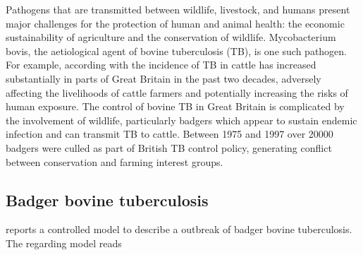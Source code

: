 Pathogens that are transmitted between wildlife, livestock, and humans present
major challenges for the protection of human and animal health: the economic
sustainability of agriculture and the conservation of wildlife. Mycobacterium
bovis, the aetiological agent of bovine tuberculosis (TB), is one such pathogen.
For example, according with \citet{Donnelly2003} the incidence of TB in cattle 
has increased substantially in parts of Great Britain in the past two decades, 
adversely affecting the livelihoods of cattle farmers and potentially 
increasing the risks of human exposure. The control of bovine TB in Great 
Britain is complicated by the involvement of wildlife, particularly badgers 
which appear to sustain endemic infection and can transmit TB to cattle. 
Between \num{1975} and \num{1997} over \num{20000} badgers were
culled as part of British TB control policy, generating conflict between
conservation and farming interest groups.

\subsection*{Badger bovine tuberculosis}
\citet{Bolzoni2014} reports a controlled model to describe a outbreak of badger 
bovine tuberculosis. The regarding model reads

